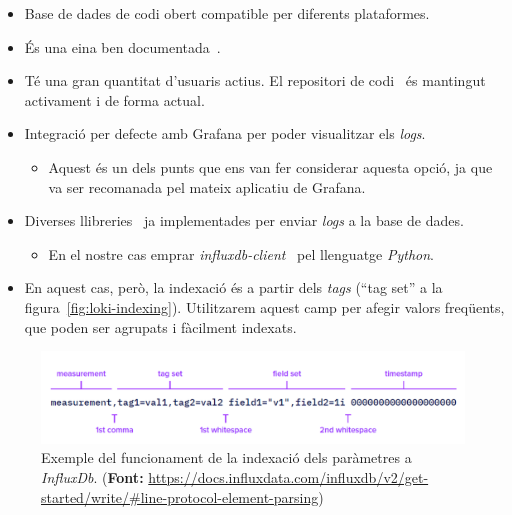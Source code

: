 \begin{itemize}
    \item Base de dades de codi obert compatible per diferents plataformes.
    \item És una eina ben documentada~\cite{influxdb:documentation}.
    \item Té una gran quantitat d’usuaris actius.
    El repositori de codi~\cite{influxdb:code} és mantingut activament i de forma actual.
    \item Integració per defecte amb Grafana per poder visualitzar els \textit{logs}.
    \begin{itemize}
        \item Aquest és un dels punts que ens van fer considerar aquesta opció, ja que va ser recomanada pel mateix aplicatiu de Grafana.
    \end{itemize}
    \item Diverses llibreries~\cite{influxdb:libraries} ja implementades per enviar \textit{\gls{log}s} a la base de dades.
    \begin{itemize}
        \item En el nostre cas emprar \textit{influxdb-client}~\cite{influxdb:python} pel llenguatge \textit{Python}.
    \end{itemize}
    \item En aquest cas, però, la indexació és a partir dels \textit{tags} (``tag set'' a la figura~\ref{fig:loki-indexing}).
    Utilitzarem aquest camp per afegir valors freqüents, que poden ser agrupats i fàcilment indexats.
\end{itemize}

\begin{figure}[htbp]
    \centerline{\includegraphics[width=1\textwidth]{figures/influxdb-indexing}}
    \captionsetup{justification=centering}
    \caption[Exemple del funcionament de la indexació dels paràmetres a \textit{InfluxDb}.]{Exemple del funcionament de la indexació dels paràmetres a \textit{InfluxDb}. (\textbf{Font:} \url{https://docs.influxdata.com/influxdb/v2/get-started/write/\#line-protocol-element-parsing})}\label{fig:influxdb-indexing}
\end{figure}

